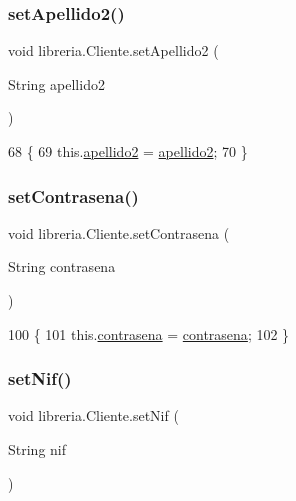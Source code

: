 \subsubsection{\texorpdfstring{set\+Apellido2()}{setApellido2()}}
{\footnotesize\ttfamily void libreria.\+Cliente.\+set\+Apellido2 (\begin{DoxyParamCaption}\item[{String}]{apellido2 }\end{DoxyParamCaption})\hspace{0.3cm}{\ttfamily [inline]}}


\begin{DoxyCode}
68                                                \{
69         this.\mbox{\hyperlink{classlibreria_1_1_cliente_a9b97686667a729a4c0fd8b19d72b389a}{apellido2}} = \mbox{\hyperlink{classlibreria_1_1_cliente_a9b97686667a729a4c0fd8b19d72b389a}{apellido2}};
70     \}
\end{DoxyCode}
\mbox{\label{classlibreria_1_1_cliente_a7b98051bfe7df2214d6e191a72cd3e11}} 
\subsubsection{\texorpdfstring{set\+Contrasena()}{setContrasena()}}
{\footnotesize\ttfamily void libreria.\+Cliente.\+set\+Contrasena (\begin{DoxyParamCaption}\item[{String}]{contrasena }\end{DoxyParamCaption})\hspace{0.3cm}{\ttfamily [inline]}}


\begin{DoxyCode}
100                                                  \{
101         this.\mbox{\hyperlink{classlibreria_1_1_cliente_a0d80894cab7e9d1e3b531d29cf160737}{contrasena}} = \mbox{\hyperlink{classlibreria_1_1_cliente_a0d80894cab7e9d1e3b531d29cf160737}{contrasena}};
102     \}
\end{DoxyCode}
\mbox{\label{classlibreria_1_1_cliente_a2c5a66f0c73787d2f0e316a2a01159f1}} 
\subsubsection{\texorpdfstring{set\+Nif()}{setNif()}}
{\footnotesize\ttfamily void libreria.\+Cliente.\+set\+Nif (\begin{DoxyParamCaption}\item[{String}]{nif }\end{DoxyParamCaption})\hspace{0.3cm}{\ttfamily [inline]}}


